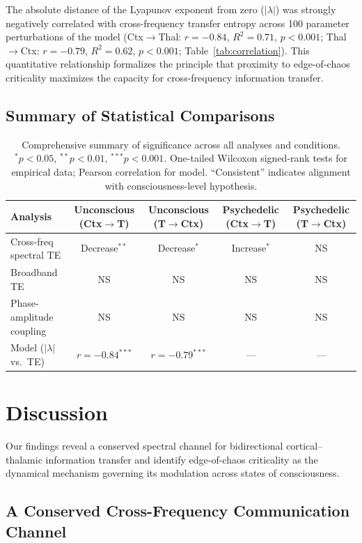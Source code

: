 \documentclass[11pt]{article}
\begin{document}
The absolute distance of the Lyapunov exponent from zero ($|\lambda|$) was strongly negatively correlated with cross-frequency transfer entropy across 100 parameter perturbations of the model (Ctx$\to$Thal: $r = -0.84$, $R^2 = 0.71$, $p < 0.001$; Thal$\to$Ctx: $r = -0.79$, $R^2 = 0.62$, $p < 0.001$; Table~\ref{tab:correlation}). This quantitative relationship formalizes the principle that proximity to edge-of-chaos criticality maximizes the capacity for cross-frequency information transfer.

\subsection{Summary of Statistical Comparisons}

\begin{table}[H]
\centering
\caption{Comprehensive summary of significance across all analyses and conditions. $^{*}p<0.05$, $^{**}p<0.01$, $^{***}p<0.001$. One-tailed Wilcoxon signed-rank tests for empirical data; Pearson correlation for model. ``Consistent'' indicates alignment with consciousness-level hypothesis.}
\label{tab:summary}
\begin{tabular}{lcccc}
\toprule
Analysis & Unconscious (Ctx$\to$T) & Unconscious (T$\to$Ctx) & Psychedelic (Ctx$\to$T) & Psychedelic (T$\to$Ctx) \\
\midrule
Cross-freq spectral TE & Decrease$^{**}$ & Decrease$^{*}$ & Increase$^{*}$ & NS \\
Broadband TE & NS & NS & NS & NS \\
Phase-amplitude coupling & NS & NS & NS & NS \\
Model ($|\lambda|$ vs.\ TE) & $r = -0.84^{***}$ & $r = -0.79^{***}$ & --- & --- \\
\bottomrule
\end{tabular}
\end{table}

\section{Discussion}

Our findings reveal a conserved spectral channel for bidirectional cortical--thalamic information transfer and identify edge-of-chaos criticality as the dynamical mechanism governing its modulation across states of consciousness.

\subsection{A Conserved Cross-Frequency Communication Channel}
\end{document}
